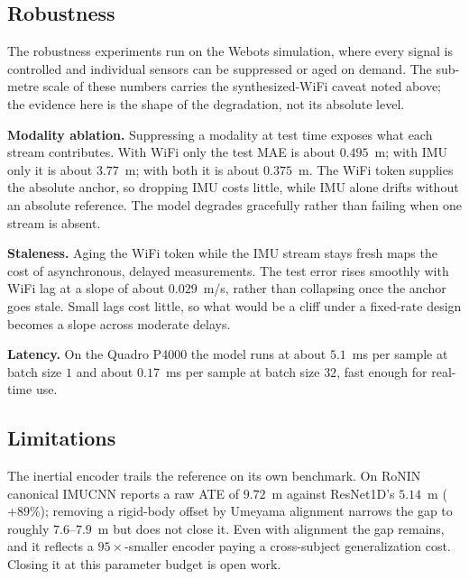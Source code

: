 \subsection{Robustness}

\noindent
The robustness experiments run on the Webots simulation, where every signal is
controlled and individual sensors can be suppressed or aged on demand. The
sub-metre scale of these numbers carries the synthesized-WiFi caveat noted
above; the evidence here is the shape of the degradation, not its absolute
level.

\textbf{Modality ablation.} Suppressing a modality at test time exposes what
each stream contributes. With WiFi only the test MAE is about $0.495$~m; with
IMU only it is about $3.77$~m; with both it is about $0.375$~m.
The WiFi token supplies the absolute anchor, so dropping IMU costs little, while
IMU alone drifts without an absolute reference. The model degrades gracefully
rather than failing when one stream is absent.

\textbf{Staleness.} Aging the WiFi token while the IMU stream stays fresh maps
the cost of asynchronous, delayed measurements. The test error rises smoothly
with WiFi lag at a slope of about $0.029$~m/s, rather than collapsing once the
anchor goes stale.
Small lags cost little, so what would be a cliff under a fixed-rate design
becomes a slope across moderate delays.

\textbf{Latency.} On the Quadro P4000 the model runs at about $5.1$~ms per
sample at batch size $1$ and about $0.17$~ms per sample at batch size $32$,
fast enough for real-time use.

\subsection{Limitations}\label{sec:limitations}

\noindent
The inertial encoder trails the reference on its own benchmark. On RoNIN
canonical IMUCNN reports a raw ATE of $9.72$~m against ResNet1D's $5.14$~m
($+89\%$); removing a rigid-body offset by Umeyama alignment narrows the gap to
roughly $7.6$--$7.9$~m but does not close it.
Even with alignment the gap remains, and it reflects a $95\times$-smaller
encoder paying a cross-subject generalization cost. Closing it at this parameter
budget is open work.

